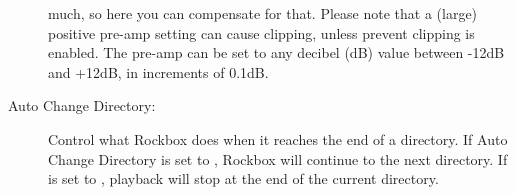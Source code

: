 \begin{description}
{{\begin{description}
            much, so here you can compensate for that. Please note that a 
            (large) positive pre-amp setting can cause clipping, unless 
            prevent clipping is enabled.  The pre-amp can be set to any 
            decibel (dB) value between -12dB and +12dB, in increments of 0.1{}dB.
        \end{description}
        }
    }
    \item[Auto Change Directory: ]Control what Rockbox does when it reaches the end
      of a directory. If Auto Change Directory is set to , Rockbox will 
      continue to the next directory. If  is set to ,
      playback will stop at the end of the current directory.
	\end{description}
